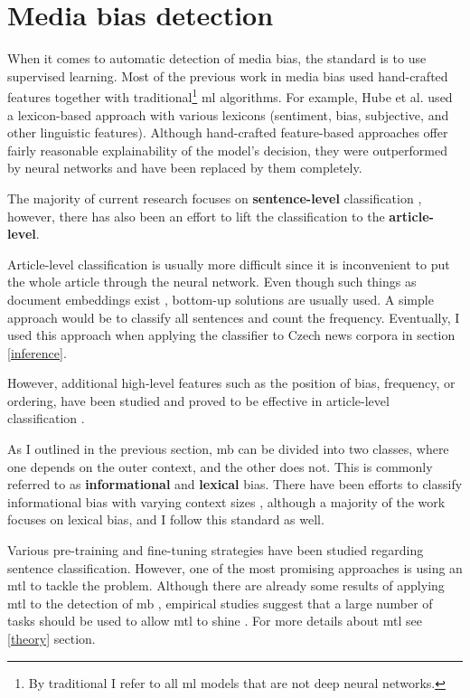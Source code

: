 \section{Media bias detection}\label{mediabias}
When it comes to automatic detection of media bias, the standard is to use supervised learning. Most of the previous work in media bias used hand-crafted features together with traditional\footnote{By traditional I refer to all \Gls{ml} models that are not deep neural networks.} \Gls{ml} algorithms. For example, Hube et al. \cite{hube2018detecting} used a lexicon-based approach with various lexicons (sentiment, bias, subjective, and other linguistic features). Although hand-crafted feature-based approaches offer fairly reasonable explainability of the model's decision, they were outperformed by neural networks and have been replaced by them completely.

The majority of current research focuses on \textbf{sentence-level} classification \cite{sinha2021determining,Spinde2021MBIC,lee2021unifying,hube2019neural}, however, there has also been an effort to lift the classification to the \textbf{article-level}.

Article-level classification is usually more difficult since it is inconvenient to put the whole article through the neural network. Even though such things as document embeddings exist \cite{lau2016empirical}, bottom-up solutions are usually used. A simple approach would be to classify all sentences and count the frequency. Eventually, I used this approach when applying the classifier to Czech news corpora in section \ref{inference}.

However, additional high-level features such as the position of bias, frequency, or ordering, have been studied and proved to be effective in article-level classification \cite{chen2020detecting,chen-etal-2020-analyzing}.

As I outlined in the previous section, \gls{mb} can be divided into two classes, where one depends on the outer context, and the other does not. This is commonly referred to as \textbf{informational} and \textbf{lexical} bias. There have been efforts to classify informational bias with varying context sizes \cite{van2020context}, although a majority of the work focuses on lexical bias, and I follow this standard as well.

Various pre-training and fine-tuning strategies have been studied regarding sentence classification. However, one of the most promising approaches is using an \Gls{mtl} to tackle the problem. Although there are already some results of applying \Gls{mtl} to the detection of \gls{mb} \cite{lee2021unifying,spindeexploiting}, empirical studies suggest that a large number of tasks should be used to allow \Gls{mtl} to shine \cite{aribandi2021ext5}. For more details about \gls{mtl} see \ref{theory} section.

\let\cleardoublepage\clearpage